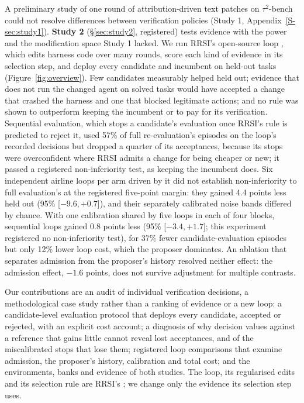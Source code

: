 \documentclass[11pt]{article}
\begin{document}
A preliminary study of one round of attribution-driven text patches on $\tau^2$-bench \citep{barres2025tau2} could not resolve differences between verification policies (Study 1, Appendix~\ref*{S-sec:study1}). \textbf{Study 2} (\S\ref{sec:study2}, registered) tests evidence with the power and the modification space Study 1 lacked. We run RRSI's open-source loop \citep{rrsi2026}, which edits harness code over many rounds, score each kind of evidence in its selection step, and deploy every candidate and incumbent on held-out tasks (Figure~\ref{fig:overview}). Few candidates measurably helped held out; evidence that does not run the changed agent on solved tasks would have accepted a change that crashed the harness and one that blocked legitimate actions; and no rule was shown to outperform keeping the incumbent or to pay for its verification. Sequential evaluation, which stops a candidate's evaluation once RRSI's rule is predicted to reject it, used 57\% of full re-evaluation's episodes on the loop's recorded decisions but dropped a quarter of its acceptances, because its stops were overconfident where RRSI admits a change for being cheaper or new; it passed a registered non-inferiority test, as keeping the incumbent does. Six independent airline loops per arm driven by it did not establish non-inferiority to full evaluation's at the registered five-point margin: they gained 4.4 points less held out (95\% [$-9.6,+0.7$]), and their separately calibrated noise bands differed by chance. With one calibration shared by five loops in each of four blocks, sequential loops gained 0.8 points less (95\% [$-3.4,+1.7$]; this experiment registered no non-inferiority test), for 37\% fewer candidate-evaluation episodes but only 12\% lower loop cost, which the proposer dominates. An ablation that separates admission from the proposer's history resolved neither effect: the admission effect, $-1.6$ points, does not survive adjustment for multiple contrasts.

Our contributions are an audit of individual verification decisions, a methodological case study rather than a ranking of evidence or a new loop: a candidate-level evaluation protocol that deploys every candidate, accepted or rejected, with an explicit cost account; a diagnosis of why decision values against a reference that gains little cannot reveal lost acceptances, and of the miscalibrated stops that lose them; registered loop comparisons that examine admission, the proposer's history, calibration and total cost; and the environments, banks and evidence of both studies. The loop, its regularised edits and its selection rule are RRSI's \citep{rrsi2026}; we change only the evidence its selection step uses.
\end{document}
